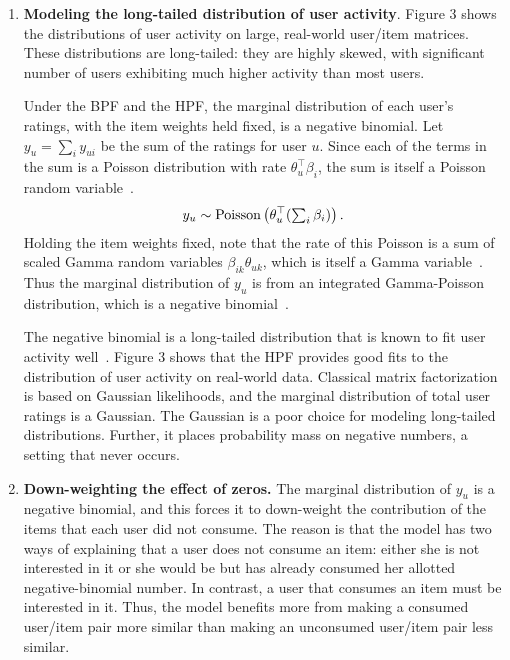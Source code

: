 \begin{enumerate}
\item {\bf Modeling the long-tailed distribution of user activity}.
  Figure 3 shows the distributions of user activity on large,
  real-world user/item matrices. These distributions are long-tailed:
  they are highly skewed, with significant number of users exhibiting
  much higher activity than most users.

Under the BPF and the HPF, the marginal distribution of each user's
ratings, with the item weights held fixed, is a negative binomial.
Let $y_{u} = \sum_{i} y_{ui}$ be the sum of the ratings for user $u$.
Since each of the terms in the sum is a Poisson distribution with rate
$\theta_u^\top \beta_i$, the sum is itself a Poisson random
variable~\cite{Johnson:2005}.
\begin{equation}
  y_u \sim \textrm{Poisson}\left(\theta_u^\top (\textstyle \sum_{i} \beta_{i})\right).
\end{equation}
Holding the item weights fixed, note that the rate of this Poisson is
a sum of scaled Gamma random variables $\beta_{ik} \theta_{uk}$, which
is itself a Gamma variable~\cite{Norman:1994}.  Thus the marginal
distribution of $y_u$ is from an integrated Gamma-Poisson
distribution, which is a negative binomial~\cite{Gelman:1995}.

The negative binomial is a long-tailed distribution that is known to
fit user activity well~\cite{Goodhardt:1984,Dunning:1993}.  Figure 3
shows that the HPF provides good fits to the distribution of user
activity on real-world data.  Classical matrix factorization is based
on Gaussian likelihoods, and the marginal distribution of total user
ratings is a Gaussian.  The Gaussian is a poor choice for modeling
long-tailed distributions. Further, it places probability mass on
negative numbers, a setting that never occurs.


\item {\bf Down-weighting the effect of zeros.}
The marginal distribution of $y_u$ is a negative binomial, and this
forces it to down-weight the contribution of the items that each user
did not consume. The reason is that the model has two ways of
explaining that a user does not consume an item: either she is not
interested in it or she would be but has already consumed her allotted
negative-binomial number.  In contrast, a user that consumes an item
must be interested in it.  Thus, the model benefits more from making a
consumed user/item pair more similar than making an unconsumed
user/item pair less similar.


\end{enumerate}
